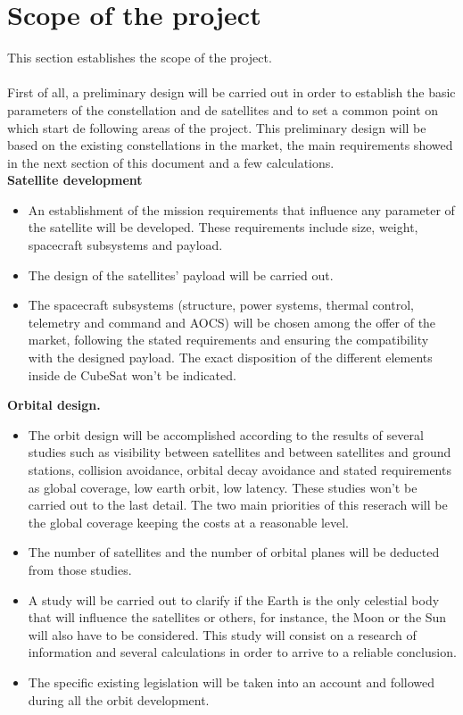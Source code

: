 \section{Scope of the project}
This section establishes the scope of the project. \\\\
	First of all, a preliminary design will be carried out in order to establish the basic parameters of the constellation and de satellites and to set a common point on which start de following areas of the project. This preliminary design will be based on the existing constellations in the market, the main requirements showed in the next section of this document and a few calculations. \\
{\bfseries Satellite development} 
\begin{itemize}
	\item An establishment of the mission requirements that influence any parameter of the satellite will be developed. These requirements include size, weight, spacecraft subsystems and payload. 
	\item The design of the satellites' payload will be carried out. 
	\item The spacecraft subsystems (structure, power systems, thermal control, telemetry and command and AOCS) will be chosen among the offer of the market, following the stated requirements and ensuring the compatibility with the designed payload. The exact  disposition of the different elements inside de CubeSat won't be indicated. 
 
\end{itemize}

{\bfseries Orbital design.}

\begin{itemize}
	\item The orbit design will be accomplished according to the results of several studies such as visibility between satellites and between satellites and ground stations, collision avoidance, orbital decay avoidance and stated requirements as global coverage, low earth orbit, low latency.  These studies won't be carried out to the last detail. The two main priorities of this reserach will be the global coverage keeping the costs at a reasonable level. 
	\item The number of satellites and the number of orbital planes will be deducted from those studies. 
	\item A study will be carried out to clarify if the Earth is the only celestial body that will influence the satellites or others, for instance, the Moon or the Sun will also have to be considered. This study will consist on a research of information and several calculations in order to arrive to a reliable conclusion.  
	\item The specific existing legislation will be taken into an account and followed during all the orbit development.
\end{itemize}

